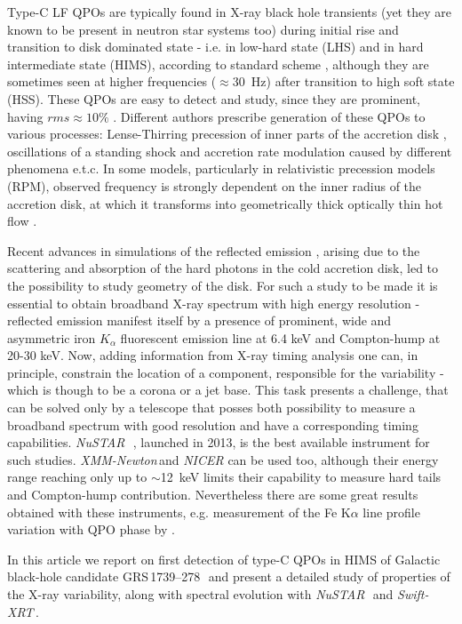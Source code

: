 \documentclass[a4paper,fleqn,usenatbib]{mnras}
\def\grs{{GRS\,1739--278\,}}
\def\swiftx{{\em Swift-XRT\,}}
\def\xmm{{\em XMM-Newton\,}}
\def\nustar{{\em NuSTAR\,}}
\begin{document}
Type-C LF QPOs are typically found in X-ray black hole transients (yet they are known to be present in neutron star systems too) during initial rise and transition to disk dominated state - i.e. in low-hard state (LHS) and in hard intermediate state (HIMS), according to standard scheme \citep{grebenev97, tanaka96, remillard06, belloni10}, although they are sometimes seen at higher frequencies ($\approx$30~Hz) after transition to high soft state (HSS). These QPOs are easy to detect and study, since they are prominent, having $rms\approx10\%$ \citep{casella05}. 
Different authors prescribe generation of these QPOs to various processes: Lense-Thirring precession of inner parts of the accretion disk \citep{stella98, ingram09}, oscillations of a standing shock \citep{molteni96} and accretion rate modulation caused by different phenomena \citep{tagger99,cabanac10} e.t.c. 
In some models, particularly in relativistic precession models (RPM), observed frequency is strongly dependent on the inner radius of the accretion disk, at which it transforms into geometrically thick optically thin hot flow . 

Recent advances in simulations of the reflected emission \citep{ross05,garcia14}, arising due to the scattering and absorption of the hard photons in the cold accretion disk, led to the possibility to study geometry of the disk.  
For such a study to be made it is essential to obtain broadband X-ray spectrum with high energy resolution - reflected emission manifest itself by a presence of prominent, wide and asymmetric iron $K_{\alpha}$ fluorescent emission line at 6.4 keV and Compton-hump at 20-30 keV. 
Now, adding information from X-ray timing analysis one can, in principle, constrain the location of a component, responsible for the variability - which is though to be a corona or a jet base.
This task presents a challenge, that can be solved only by a telescope that posses both possibility to measure a broadband spectrum with good resolution and have a corresponding timing capabilities. 
\nustar\, \citep{harrison13_nust}, launched in 2013, is the best available instrument for such studies. 
\xmm and {\it NICER} can be used too, although their energy range reaching only up to $\sim$12~keV limits their capability to measure hard tails and Compton-hump contribution.
Nevertheless there are some great results obtained with these instruments, e.g. measurement of the Fe K$\alpha$ line profile variation with QPO phase by \citet[][]{ingram16}. 

In this article we report on first detection of type-C QPOs in HIMS of Galactic black-hole candidate \grs\, and present a detailed study of properties of the X-ray variability, along with spectral evolution with \nustar\ and \swiftx.
\end{document}
